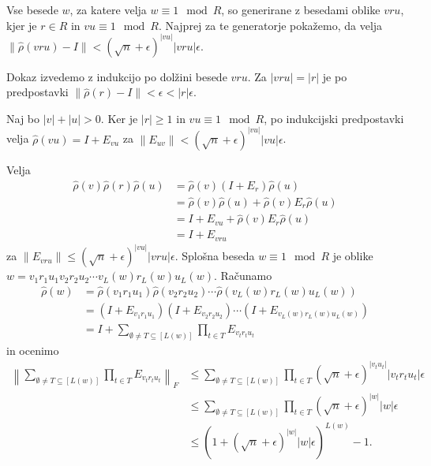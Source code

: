 \documentclass[mat2, tisk]{fmfdelo}
\newcommand{\TODO}[1]{{\color{blue} TODO: #1}}
\begin{document}
\begin{dokaz}
  Vse besede $w$, za katere velja $w \equiv 1 \mod R$,
  so generirane z besedami oblike
  $v r u$, kjer je $r \in R$ in $vu \equiv 1 \mod R$.
  Najprej za te generatorje pokažemo, da velja
  $\|\hat \rho(v r u) - I\| < (\sqrt{n} + \epsilon)^{|v u|}
  |v r u| \epsilon.$

  Dokaz izvedemo z indukcijo po dolžini besede $v r u$.
  Za $|v r u| = |r|$ je po predpostavki
  $\|\hat \rho(r) - I\| < \epsilon < |r|\epsilon$. %

  Naj bo $|v| + |u| > 0$. Ker je $|r| \geq 1$ in
  $vu \equiv 1 \mod R$, po indukcijski predpostavki velja
  $
  \hat \rho(vu) = I + E_{vu}
  $ za $ \|E_{uv}\| < (\sqrt{n}+ \epsilon)^{|vu|} |vu| \epsilon$.

  Velja
  \begin{align*}
    \hat \rho (v) \hat \rho(r) \hat \rho(u) &=
    \hat \rho(v) (I + E_r) \hat \rho(u) \\
    &= \hat \rho(v) \hat \rho(u) +
    \hat \rho(v) E_r \hat \rho(u) \\
    &= I + E_{vu} + \hat \rho(v) E_r \hat \rho(u) \\
    &= I + E_{vru}
  \end{align*}
  za $\| E_{vru}\|  %
  \leq (\sqrt{n}+ \epsilon)^{|vu|}|vru|\epsilon$.
  Splošna beseda $w \equiv 1 \mod R$ je oblike
  $w = v_1 r_1  u_1 v_2 r_2 u_2 \dotsm v_L(w) r_L(w) u_L(w)$.
  Računamo
  \begin{align*}
    \hat \rho (w) &=
    \hat \rho (v_1 r _1 u_1) \hat \rho (v_2 r _2 u_2) \dotsm
    \hat \rho (v_L(w) r _L(w) u_L(w)) \\
    &= (I + E_{v_1 r_1 u_1}) (I + E_{v_2 r_2 u_2}) \dotsm
    (I + E_{v_L(w) r_L(w) u_L(w)}) \\
    &= I + \sum_{\emptyset \neq T \subseteq [L(w)] }
    \prod_{t \in T} E_{v_t r_t u_t}
  \end{align*}
  in ocenimo
  \begin{align*}
    \left\| \sum_{\emptyset \neq T \subseteq [L(w)] }
    \prod_{t \in T} E_{v_t r_t u_t} \right\| _F
    &\leq
    \sum_{\emptyset \neq T \subseteq [L(w)] }
    \prod_{t \in T} (\sqrt{n} + \epsilon)^{|v_t u_t|} |v_t r_t
    u_t| \epsilon \\
    &\leq
    \sum_{\emptyset \neq T \subseteq [L(w)] }
    \prod_{t \in T} (\sqrt{n} + \epsilon)^{|w|} |w| \epsilon \\
    &\leq
    \left( 1 + (\sqrt{n} + \epsilon)^{|w|} |w| \epsilon \right)^{L(w)} - 1.
  \end{align*}
\end{dokaz}
\end{document}
